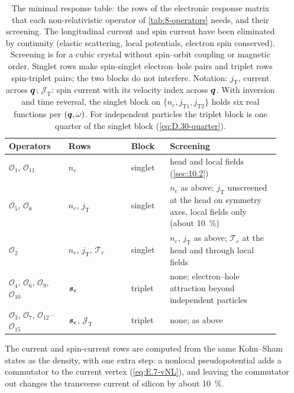 \begin{table}[tbp]
  \caption{The minimal response table: the rows of the electronic response matrix that each non-relativistic operator of \cref{tab:8-operators} needs, and their screening. The longitudinal current and spin current have been eliminated by continuity (elastic scattering, local potentials, electron spin conserved). Screening is for a cubic crystal without spin--orbit coupling or magnetic order. Singlet rows make spin-singlet electron--hole pairs and triplet rows spin-triplet pairs; the two blocks do not interfere. Notation: $j_{\mathrm{T}}$, current across $\bm{q}$; $\mathcal{J}_{\mathrm{T}}$: spin current with its velocity index across $\bm{q}$. With inversion and time reversal, the singlet block on $\{n_e, j_{\mathrm{T}1}, j_{\mathrm{T}2}\}$ holds six real functions per $(\bm{q},\omega)$. For independent particles the triplet block is one quarter of the singlet block (\cref{eq:D.30-quarter}).}
  \label{tab:10-minimal}
  \centering\small
  \renewcommand{\arraystretch}{1.25}
  \begin{tabular}{@{}>{\raggedright\arraybackslash}p{0.2\linewidth}>{\raggedright\arraybackslash}p{0.21\linewidth}>{\raggedright\arraybackslash}p{0.13\linewidth}>{\raggedright\arraybackslash}p{0.37\linewidth}@{}}
    \toprule
    Operators & Rows & Block & Screening \\
    \midrule
    $\mathcal{O}_1$, $\mathcal{O}_{11}$ & $n_e$ & singlet & head and local fields (\cref{sec:10.2}) \\
    $\mathcal{O}_5$, $\mathcal{O}_8$ & $n_e$, $j_{\mathrm{T}}$ & singlet & $n_e$ as above; $j_{\mathrm{T}}$ unscreened at the head on symmetry axes, local fields only (about \SI{10}{\percent}) \\
    $\mathcal{O}_2$ & $n_e$, $j_{\mathrm{T}}$, $\mathcal{T}_e$ & singlet & $n_e$, $j_{\mathrm{T}}$ as above; $\mathcal{T}_e$ at the head and through local fields \\
    $\mathcal{O}_4$, $\mathcal{O}_6$, $\mathcal{O}_9$, $\mathcal{O}_{10}$ & $\bm{s}_e$ & triplet & none; electron--hole attraction beyond independent particles \\
    $\mathcal{O}_3$, $\mathcal{O}_7$, $\mathcal{O}_{12}$--$\mathcal{O}_{15}$ & $\bm{s}_e$, $\mathcal{J}_{\mathrm{T}}$ & triplet & none; as above \\
    \bottomrule
  \end{tabular}
\end{table}

The current and spin-current rows are computed from the same Kohn--Sham states as the density, with one extra step: a nonlocal pseudopotential adds a commutator to the current vertex (\cref{eq:E.7-vNL}), and leaving the commutator out changes the transverse current of silicon by about \SI{10}{\percent}.

